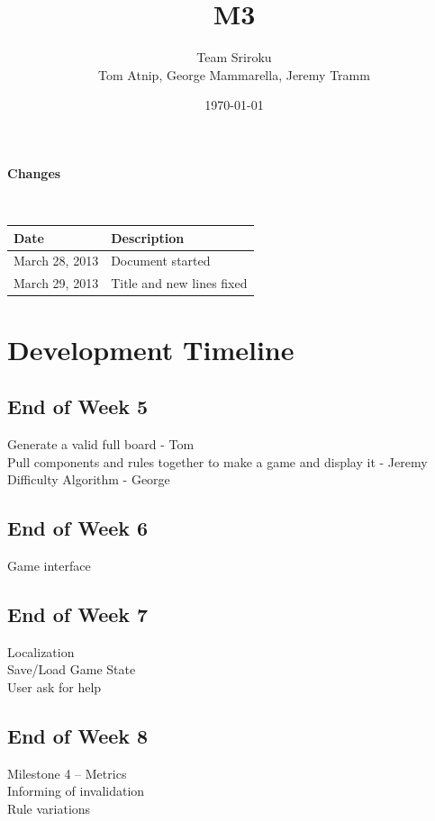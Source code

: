 \documentclass{article}
\begin{document}
\setlength{\voffset}{3.5in}
\title{M3}
\author{\Large Team Sriroku\\
Tom Atnip, George Mammarella, Jeremy Tramm}
\date{\today}
\maketitle
\clearpage
\setlength{\voffset}{0pt}
\tableofcontents
\clearpage


\begin{Large}
\textbf{Changes}
\end{Large}
\\

\begin{tabular}{ | p{1.5in} | p{4.5in} | }
\hline
\textbf{Date} & \textbf{Description}\\
\hline
\hline
March 28, 2013 & Document started\\
\hline
\hline
March 29, 2013 & Title and new lines fixed\\
\hline
\end{tabular}
\clearpage

\section{Development Timeline}
\subsection{End of Week 5}
Generate a valid full board - Tom\\
Pull components and rules together to make a game and display it - Jeremy\\
Difficulty Algorithm - George\\

\subsection{End of Week 6}
Game interface

\subsection{End of  Week 7}
Localization\\
Save/Load Game State\\
User ask for help\\

\subsection{End of Week 8}
Milestone 4 – Metrics\\
Informing of invalidation\\
Rule variations\\
\end{document}
